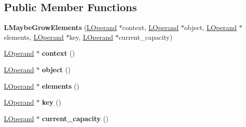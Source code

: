 \subsection*{Public Member Functions}
\begin{DoxyCompactItemize}
\item 
{\bfseries L\+Maybe\+Grow\+Elements} (\hyperlink{classv8_1_1internal_1_1_l_operand}{L\+Operand} $\ast$context, \hyperlink{classv8_1_1internal_1_1_l_operand}{L\+Operand} $\ast$object, \hyperlink{classv8_1_1internal_1_1_l_operand}{L\+Operand} $\ast$elements, \hyperlink{classv8_1_1internal_1_1_l_operand}{L\+Operand} $\ast$key, \hyperlink{classv8_1_1internal_1_1_l_operand}{L\+Operand} $\ast$current\+\_\+capacity)\hypertarget{classv8_1_1internal_1_1_l_maybe_grow_elements_aae48ee99b99d58f8e16bc264666c78ff}{}\label{classv8_1_1internal_1_1_l_maybe_grow_elements_aae48ee99b99d58f8e16bc264666c78ff}

\item 
\hyperlink{classv8_1_1internal_1_1_l_operand}{L\+Operand} $\ast$ {\bfseries context} ()\hypertarget{classv8_1_1internal_1_1_l_maybe_grow_elements_a6af5b70c66f542bb308ac9ada8cb6372}{}\label{classv8_1_1internal_1_1_l_maybe_grow_elements_a6af5b70c66f542bb308ac9ada8cb6372}

\item 
\hyperlink{classv8_1_1internal_1_1_l_operand}{L\+Operand} $\ast$ {\bfseries object} ()\hypertarget{classv8_1_1internal_1_1_l_maybe_grow_elements_a557ff494aa6f7b9a2a5f218005419b34}{}\label{classv8_1_1internal_1_1_l_maybe_grow_elements_a557ff494aa6f7b9a2a5f218005419b34}

\item 
\hyperlink{classv8_1_1internal_1_1_l_operand}{L\+Operand} $\ast$ {\bfseries elements} ()\hypertarget{classv8_1_1internal_1_1_l_maybe_grow_elements_aa58e07c5ac443be8021a0a6dbfe237cb}{}\label{classv8_1_1internal_1_1_l_maybe_grow_elements_aa58e07c5ac443be8021a0a6dbfe237cb}

\item 
\hyperlink{classv8_1_1internal_1_1_l_operand}{L\+Operand} $\ast$ {\bfseries key} ()\hypertarget{classv8_1_1internal_1_1_l_maybe_grow_elements_ac0b59ca4db13f2a31428c9b8063321dc}{}\label{classv8_1_1internal_1_1_l_maybe_grow_elements_ac0b59ca4db13f2a31428c9b8063321dc}

\item 
\hyperlink{classv8_1_1internal_1_1_l_operand}{L\+Operand} $\ast$ {\bfseries current\+\_\+capacity} ()\hypertarget{classv8_1_1internal_1_1_l_maybe_grow_elements_a8fc52ebb7ecf6d10f977d9b56cfe702d}{}\label{classv8_1_1internal_1_1_l_maybe_grow_elements_a8fc52ebb7ecf6d10f977d9b56cfe702d}


\end{DoxyCompactItemize}
